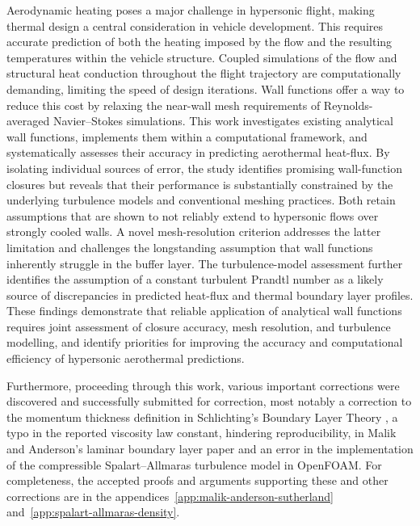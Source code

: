 
Aerodynamic heating poses a major challenge in hypersonic flight, making thermal design a central consideration in vehicle development. This requires accurate prediction of both the heating imposed by the flow and the resulting temperatures within the vehicle structure. Coupled simulations of the flow and structural heat conduction throughout the flight trajectory are computationally demanding, limiting the speed of design iterations. Wall functions offer a way to reduce this cost by relaxing the near-wall mesh requirements of Reynolds-averaged Navier--Stokes simulations. This work investigates existing analytical wall functions, implements them within a computational framework, and systematically assesses their accuracy in predicting aerothermal heat-flux.
By isolating individual sources of error, the study identifies promising wall-function closures but reveals that their performance is substantially constrained by the underlying turbulence models and conventional meshing practices. Both retain assumptions that are shown to not reliably extend to hypersonic flows over strongly cooled walls. A novel mesh-resolution criterion addresses the latter limitation and challenges the longstanding assumption that wall functions inherently struggle in the buffer layer. The turbulence-model assessment further identifies the assumption of a constant turbulent Prandtl number as a likely source of discrepancies in predicted heat-flux and thermal boundary layer profiles. These findings demonstrate that reliable application of analytical wall functions requires joint assessment of closure accuracy, mesh resolution, and turbulence modelling, and identify priorities for improving the accuracy and computational efficiency of hypersonic aerothermal predictions.

Furthermore, proceeding through this work, various important corrections were discovered and successfully submitted for correction, most notably a correction to the momentum thickness definition in Schlichting's Boundary Layer Theory \cite{SchlichtingGersten2017BoundaryLayer}, a typo in the reported viscosity law constant, hindering reproducibility, in Malik and Anderson's laminar boundary layer paper \cite{MalikAnderson1991RealGas} and an error in the implementation of the compressible Spalart--Allmaras turbulence model in OpenFOAM. For completeness, the accepted proofs and arguments supporting these and other corrections are in the appendices~\ref{app:malik-anderson-sutherland} and~\ref{app:spalart-allmaras-density}.